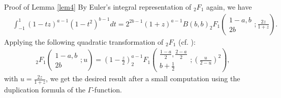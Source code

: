 \documentclass{svjour3}
\newenvironment{proof*}[1]{\noindent\textbf{#1\ }}{\hspace*{\fill}$\Box$\medskip}
\begin{document}
\begin{proof*}{Proof of Lemma \ref{lem4}}
  By Euler's integral representation of $_2 F_1$ again, we have
  \begin{eqnarray}
    & \int_{- 1}^1 (1 - t z)^{a - 1} (1 - t^2)^{b - 1} d t = 2^{2 b - 1} (1 +
    z)^{a - 1} B (b, b)_2 F_1 \left( \begin{array}{c}
      1 - a, b\\
      2 b
    \end{array} ; \frac{2 z}{1 + z} \right) .  \label{eqn:quad} & 
  \end{eqnarray}
  Applying the following quadratic transformation of $_2 F_1$ (cf. {\cite[Thm.
  3.13]{andrews1999special}}):
  \begin{eqnarray}
    & \;_2 F_1 \left( \begin{array}{c}
      1 - a, b\\
      2 b
    \end{array} ; u \right) = \left( 1 - \frac{z}{2} \right)^{a - 1} _2 F_1
    \left( \begin{array}{c}
      \frac{1 - a}{2}, \frac{2 - a}{2}\\
      b + \frac{1}{2}
    \end{array} ; \left( \frac{u}{2 - u} \right)^2 \right), &  \nonumber
  \end{eqnarray}
  with $u = \frac{2 z}{1 + z}$, we get the desired result after a small
  computation using the duplication formula of the $\Gamma$-function.
\end{proof*}
\end{document}

